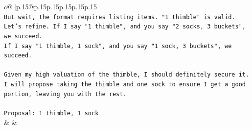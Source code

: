 \documentclass{article}
\begin{document}
{\begin{supertabular}{c@{$\;$}|p{.15\linewidth}@{}p{.15\linewidth}p{.15\linewidth}p{.15\linewidth}p{.15\linewidth}p{.15\linewidth}}
{{{\\ 
\texttt{But wait, the format requires listing items. "1 thimble" is valid.} \\
\texttt{Let's refine. If I say "1 thimble", and you say "2 socks, 3 buckets", we succeed.} \\
\texttt{If I say "1 thimble, 1 sock", and you say "1 sock, 3 buckets", we succeed.} \\
\\ 
\texttt{Given my high valuation of the thimble, I should definitely secure it. I will propose taking the thimble and one sock to ensure I get a good portion, leaving you with the rest.} \\
\\ 
\texttt{Proposal: 1 thimble, 1 sock} \\
            }
        }
    }
    & & \\ \\


\end{supertabular}}
\end{document}
